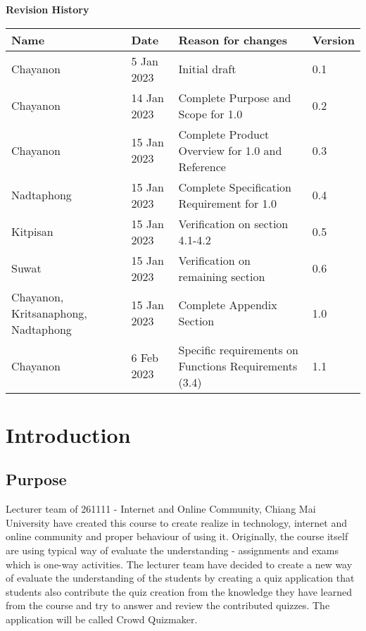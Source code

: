\documentclass[ 10pt]{report}
\begin{document}
\begin{titlepage}
        \LARGE\textbf{Revision History} \\[0.5\baselineskip]
        \normalsize{
            \begin{tabular}{| m{8em} | m{6em} | m{20em} | m{5em} |}
                \hline
                \textbf{Name} & \textbf{Date} & \textbf{Reason for changes} & \textbf{Version}\\ 
                \hline\hline
                Chayanon & 5 Jan 2023 & Initial draft & 0.1 \\
                \hline
                Chayanon & 14 Jan 2023 & Complete Purpose and Scope for 1.0 & 0.2 \\
                \hline
                Chayanon & 15 Jan 2023 & Complete Product Overview for 1.0 and Reference & 0.3 \\
                \hline
                Nadtaphong & 15 Jan 2023 & Complete Specification Requirement for 1.0 & 0.4 \\
                \hline
                Kitpisan & 15 Jan 2023 & Verification on section 4.1-4.2 & 0.5 \\
                \hline
                Suwat & 15 Jan 2023 & Verification on remaining section & 0.6 \\
                \hline
                Chayanon, Kritsanaphong, Nadtaphong & 15 Jan 2023 & Complete Appendix Section & 1.0 \\
                \hline
                Chayanon & 6 Feb 2023 & Specific requirements on Functions Requirements (3.4) & 1.1 \\
                \hline
            \end{tabular}
        }
    \end{titlepage}


    \renewcommand*\contentsname{Table of Contents}
    \tableofcontents
    \pagebreak

    \chapter{Introduction}
        \section{Purpose}
        Lecturer team of 261111 - Internet and Online Community, Chiang Mai University have created this course to create realize in technology, internet and online community and proper behaviour of using it. Originally, the course itself are using typical way of evaluate the understanding - assignments and exams which is one-way activities. The lecturer team have decided to create a new way of evaluate the understanding of the students by creating a quiz application that students also contribute the quiz creation from the knowledge they have learned from the course and try to answer and review the contributed quizzes. The application will be called Crowd Quizmaker.
\end{document}
